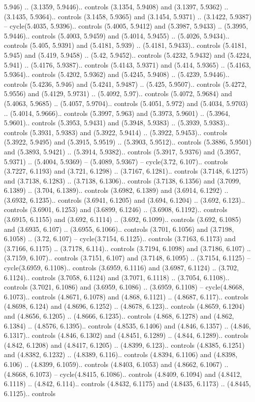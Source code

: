 5.946) .. (3.1359, 5.9446).. controls (3.1354, 5.9408) and (3.1397, 5.9362) .. (3.1435, 5.9364).. controls (3.1458, 5.9365) and (3.1454, 5.9371) .. (3.1422, 5.9387) -- cycle(5.4035, 5.9396).. controls (5.4005, 5.9412) and (5.3987, 5.9433) .. (5.3995, 5.9446).. controls (5.4003, 5.9459) and (5.4014, 5.9455) .. (5.4026, 5.9434).. controls (5.405, 5.9391) and (5.4181, 5.939) .. (5.4181, 5.9433).. controls (5.4181, 5.945) and (5.419, 5.9458) .. (5.42, 5.9452).. controls (5.4232, 5.9432) and (5.4224, 5.941) .. (5.4176, 5.9387).. controls (5.4143, 5.9371) and (5.414, 5.9365) .. (5.4163, 5.9364).. controls (5.4202, 5.9362) and (5.4245, 5.9408) .. (5.4239, 5.9446).. controls (5.4236, 5.946) and (5.4241, 5.9487) .. (5.425, 5.9507).. controls (5.4272, 5.9556) and (5.4129, 5.9731) .. (5.4092, 5.97).. controls (5.4072, 5.9684) and (5.4063, 5.9685) .. (5.4057, 5.9704).. controls (5.4051, 5.972) and (5.4034, 5.9703) .. (5.4014, 5.9666).. controls (5.3997, 5.963) and (5.3973, 5.9601) .. (5.3964, 5.9601).. controls (5.3953, 5.9431) and (5.3948, 5.9383) .. (5.3939, 5.9383).. controls (5.3931, 5.9383) and (5.3922, 5.9414) .. (5.3922, 5.9453).. controls (5.3922, 5.9495) and (5.3915, 5.9519) .. (5.3903, 5.9512).. controls (5.3886, 5.9501) and (5.3893, 5.9421) .. (5.3914, 5.9382).. controls (5.3917, 5.9376) and (5.3957, 5.9371) .. (5.4004, 5.9369) -- (5.4089, 5.9367) -- cycle(3.72, 6.107).. controls (3.7227, 6.1193) and (3.721, 6.1298) .. (3.7167, 6.1281).. controls (3.7148, 6.1275) and (3.7138, 6.1283) .. (3.7138, 6.1306).. controls (3.7138, 6.1356) and (3.7099, 6.1389) .. (3.704, 6.1389).. controls (3.6982, 6.1389) and (3.6914, 6.1292) .. (3.6932, 6.1235).. controls (3.6941, 6.1205) and (3.694, 6.1204) .. (3.692, 6.123).. controls (3.6901, 6.1253) and (3.6899, 6.1246) .. (3.6908, 6.1192).. controls (3.6915, 6.1155) and (3.692, 6.1114) .. (3.692, 6.1099).. controls (3.692, 6.1085) and (3.6935, 6.107) .. (3.6955, 6.1066).. controls (3.701, 6.1056) and (3.7198, 6.1058) .. (3.72, 6.107) -- cycle(3.7154, 6.1125).. controls (3.7163, 6.1173) and (3.7166, 6.1175) .. (3.7178, 6.114).. controls (3.7194, 6.1098) and (3.7186, 6.107) .. (3.7159, 6.107).. controls (3.7151, 6.107) and (3.7148, 6.1095) .. (3.7154, 6.1125) -- cycle(3.6959, 6.1108).. controls (3.6959, 6.1116) and (3.6987, 6.1124) .. (3.702, 6.1124).. controls (3.7058, 6.1124) and (3.7071, 6.1118) .. (3.7054, 6.1108).. controls (3.7021, 6.1086) and (3.6959, 6.1086) .. (3.6959, 6.1108) -- cycle(4.8668, 6.1073).. controls (4.8671, 6.1078) and (4.868, 6.1121) .. (4.8687, 6.117).. controls (4.8698, 6.124) and (4.8696, 6.1252) .. (4.8678, 6.123).. controls (4.8659, 6.1204) and (4.8656, 6.1205) .. (4.8666, 6.1235).. controls (4.868, 6.1278) and (4.862, 6.1384) .. (4.8576, 6.1395).. controls (4.8535, 6.1406) and (4.846, 6.1357) .. (4.846, 6.1317).. controls (4.846, 6.1302) and (4.8451, 6.1289) .. (4.844, 6.1289).. controls (4.842, 6.1208) and (4.8417, 6.1205) .. (4.8399, 6.123).. controls (4.8385, 6.1251) and (4.8382, 6.1232) .. (4.8389, 6.116).. controls (4.8394, 6.1106) and (4.8398, 6.106) .. (4.8399, 6.1059).. controls (4.8403, 6.1053) and (4.8662, 6.1067) .. (4.8668, 6.1073) -- cycle(4.8415, 6.1086).. controls (4.8409, 6.1094) and (4.8412, 6.1118) .. (4.842, 6.114).. controls (4.8432, 6.1175) and (4.8435, 6.1173) .. (4.8445, 6.1125).. controls 